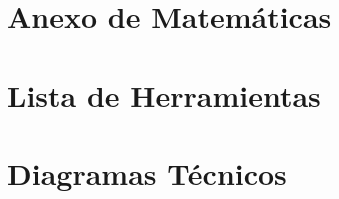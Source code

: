 \documentclass[12pt, twoside]{book}
\begin{document}
	\begin{appendix}
		\chapter{Anexo de Matemáticas}
		
		
		\chapter{Lista de Herramientas}
		
		
		\chapter{Diagramas Técnicos}
		
		
		
	\end{appendix}
	
\end{document}
